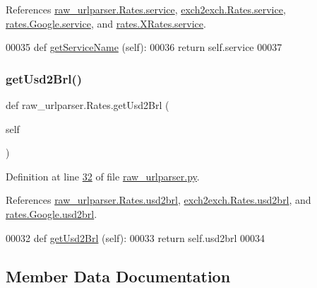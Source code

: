 References \hyperlink{raw__urlparser_8py_source_l00027}{raw\+\_\+urlparser.\+Rates.\+service}, \hyperlink{exch2exch_8py_source_l00031}{exch2exch.\+Rates.\+service}, \hyperlink{rates_8py_source_l00094}{rates.\+Google.\+service}, and \hyperlink{rates_8py_source_l00149}{rates.\+X\+Rates.\+service}.


\begin{DoxyCode}
00035     \textcolor{keyword}{def }\hyperlink{namespacerates_a5dd7b6601bc66e313c26984e32f1e290}{getServiceName} (self):
00036         \textcolor{keywordflow}{return} self.service
00037         
\end{DoxyCode}
\mbox{\label{classraw__urlparser_1_1_rates_ab21c629a2310a331a7b66e991868b6d3}} 
\subsubsection{\texorpdfstring{get\+Usd2\+Brl()}{getUsd2Brl()}}
{\footnotesize\ttfamily def raw\+\_\+urlparser.\+Rates.\+get\+Usd2\+Brl (\begin{DoxyParamCaption}\item[{}]{self }\end{DoxyParamCaption})}



Definition at line \hyperlink{raw__urlparser_8py_source_l00032}{32} of file \hyperlink{raw__urlparser_8py_source}{raw\+\_\+urlparser.\+py}.



References \hyperlink{raw__urlparser_8py_source_l00025}{raw\+\_\+urlparser.\+Rates.\+usd2brl}, \hyperlink{exch2exch_8py_source_l00029}{exch2exch.\+Rates.\+usd2brl}, and \hyperlink{rates_8py_source_l00091}{rates.\+Google.\+usd2brl}.


\begin{DoxyCode}
00032     \textcolor{keyword}{def }\hyperlink{namespacerates_ae4c7203ef8a919f9cf522581ca00b08a}{getUsd2Brl} (self):
00033         \textcolor{keywordflow}{return} self.usd2brl
00034     
\end{DoxyCode}


\subsection{Member Data Documentation}
\mbox{\label{classraw__urlparser_1_1_rates_adc9df007bec75344f9f89cb631d1aeb3}} 
